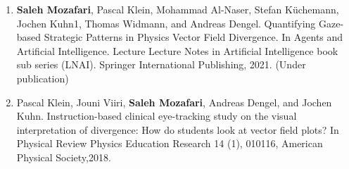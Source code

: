 \vspace{0.1cm}

\vspace{0.2cm}
\begin{enumerate}
	\item \textbf{Saleh Mozafari}, Pascal Klein, Mohammad Al-Naser, Stefan Küchemann,
	      Jochen Kuhn1, Thomas Widmann, and Andreas Dengel.  Quantifying Gaze-based Strategic Patterns in Physics Vector Field Divergence. In Agents and Artificial Intelligence. Lecture Lecture Notes in Artificial Intelligence book sub series (LNAI). Springer International Publishing, 2021. (Under publication)
	\item Pascal Klein, Jouni Viiri, \textbf{Saleh Mozafari}, Andreas Dengel, and Jochen Kuhn. Instruction-based clinical eye-tracking study on the visual interpretation of divergence: How do students look at vector field plots? In Physical Review Physics Education Research 14 (1), 010116, American Physical Society,2018.


\end{enumerate}
